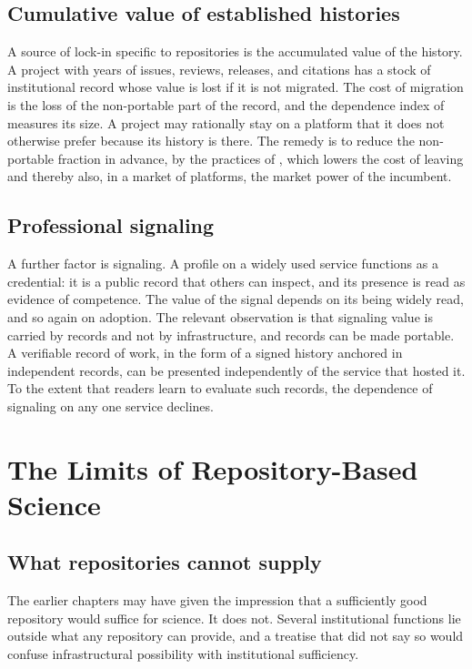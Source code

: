 \documentclass[11pt,twoside,openright]{book}
\theoremstyle{plain}
\theoremstyle{definition}
\theoremstyle{remark}
\begin{document}
\section{Cumulative value of established histories}

A source of lock-in specific to repositories is the accumulated value of the history. A project with years of issues, reviews, releases, and citations has a stock of institutional record whose value is lost if it is not migrated. The cost of migration is the loss of the non-portable part of the record, and the dependence index of  measures its size. A project may rationally stay on a platform that it does not otherwise prefer because its history is there. The remedy is to reduce the non-portable fraction in advance, by the practices of , which lowers the cost of leaving and thereby also, in a market of platforms, the market power of the incumbent.

\section{Professional signaling}

A further factor is signaling. A profile on a widely used service functions as a credential: it is a public record that others can inspect, and its presence is read as evidence of competence. The value of the signal depends on its being widely read, and so again on adoption. The relevant observation is that signaling value is carried by records and not by infrastructure, and records can be made portable. A verifiable record of work, in the form of a signed history anchored in independent records, can be presented independently of the service that hosted it. To the extent that readers learn to evaluate such records, the dependence of signaling on any one service declines.

\chapter{The Limits of Repository-Based Science}\label{ch:limits}

\section{What repositories cannot supply}

The earlier chapters may have given the impression that a sufficiently good repository would suffice for science. It does not. Several institutional functions lie outside what any repository can provide, and a treatise that did not say so would confuse infrastructural possibility with institutional sufficiency.
\end{document}
